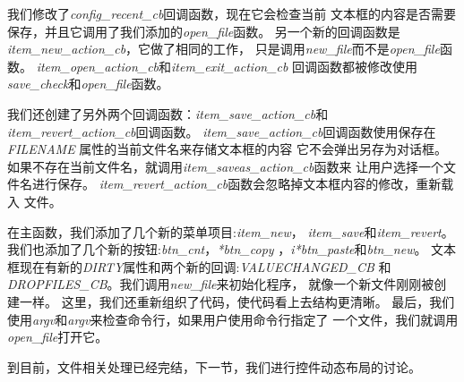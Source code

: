 \documentclass{ctexart}
\begin{document}
我们修改了\emph{config\_recent\_cb}回调函数，现在它会检查当前
文本框的内容是否需要保存，并且它调用了我们添加的\emph{open\_file}函数。
另一个新的回调函数是\emph{item\_new\_action\_cb}，它做了相同的工作，
只是调用\emph{new\_file}而不是\emph{open\_file}函数。
\emph{item\_open\_action\_cb}和\emph{item\_exit\_action\_cb}
回调函数都被修改使用\emph{save\_check}和\emph{open\_file}函数。

我们还创建了另外两个回调函数：\emph{item\_save\_action\_cb}和
\emph{item\_revert\_action\_cb}回调函数。
\emph{item\_save\_action\_cb}回调函数使用保存在\emph{FILENAME}
属性的当前文件名来存储文本框的内容 它不会弹出另存为对话框。
如果不存在当前文件名，就调用\emph{item\_saveas\_action\_cb}函数来
让用户选择一个文件名进行保存。
\emph{item\_revert\_action\_cb}函数会忽略掉文本框内容的修改，重新载入
文件。

在主函数，我们添加了几个新的菜单项目:\emph{item\_new}，
\emph{item\_save}和\emph{item\_revert}。
我们也添加了几个新的按钮:\emph{btn\_cnt}，\emph{*btn\_copy}
，\emph{i*btn\_paste}和\emph{btn\_new}。
文本框现在有新的\emph{DIRTY}属性和两个新的回调:\emph{VALUECHANGED\_CB}
和\emph{DROPFILES\_CB}。我们调用\emph{new\_file}来初始化程序，
就像一个新文件刚刚被创建一样。
这里，我们还重新组织了代码，使代码看上去结构更清晰。
最后，我们使用\emph{argv}和\emph{argv}来检查命令行，如果用户使用命令行指定了
一个文件，我们就调用\emph{open\_file}打开它。

到目前，文件相关处理已经完结，下一节，我们进行控件动态布局的讨论。
\end{document}
